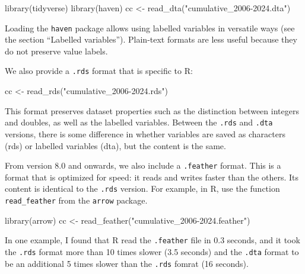 \documentclass[10pt,article,oneside]{memoir}
\newenvironment{Shaded}{\begin{snugshade}}{\end{snugshade}}
\newcommand{\FunctionTok}[1]{\textcolor[rgb]{0.28,0.35,0.67}{#1}}
\newcommand{\NormalTok}[1]{\textcolor[rgb]{0.00,0.23,0.31}{#1}}
\newcommand{\OtherTok}[1]{\textcolor[rgb]{0.00,0.23,0.31}{#1}}
\newcommand{\StringTok}[1]{\textcolor[rgb]{0.13,0.47,0.30}{#1}}
\begin{document}
\begin{Shaded}
\begin{Highlighting}[]
\FunctionTok{library}\NormalTok{(tidyverse)}
\FunctionTok{library}\NormalTok{(haven)}
\NormalTok{cc }\OtherTok{\textless{}{-}} \FunctionTok{read\_dta}\NormalTok{(}\StringTok{"cumulative\_2006{-}2024.dta"}\NormalTok{)}
\end{Highlighting}
\end{Shaded}

Loading the \texttt{haven} package allows using labelled variables in
versatile ways (see the section ``Labelled variables''). Plain-text
formats are less useful because they do not preserve value labels.

We also provide a \texttt{.rds} format that is specific to R:

\begin{Shaded}
\begin{Highlighting}[]
\NormalTok{cc }\OtherTok{\textless{}{-}} \FunctionTok{read\_rds}\NormalTok{(}\StringTok{"cumulative\_2006{-}2024.rds"}\NormalTok{)}
\end{Highlighting}
\end{Shaded}

This format preserves dataset properties such as the distinction between
integers and doubles, as well as the labelled variables. Between the
\texttt{.rds} and \texttt{.dta} versions, there is some difference in
whether variables are saved as characters (rds) or labelled variables
(dta), but the content is the same.

From version 8.0 and onwards, we also include a \texttt{.feather}
format. This is a format that is optimized for speed: it reads and
writes faster than the others. Its content is identical to the
\texttt{.rds} version. For example, in R, use the function
\texttt{read\_feather} from the \texttt{arrow} package.

\begin{Shaded}
\begin{Highlighting}[]
\FunctionTok{library}\NormalTok{(arrow)}
\NormalTok{cc }\OtherTok{\textless{}{-}} \FunctionTok{read\_feather}\NormalTok{(}\StringTok{"cumulative\_2006{-}2024.feather"}\NormalTok{)}
\end{Highlighting}
\end{Shaded}

In one example, I found that R read the \texttt{.feather} file in 0.3
seconds, and it took the \texttt{.rds} format more than 10 times slower
(3.5 seconds) and the \texttt{.dta} format to be an additional 5 times
slower than the \texttt{.rds} fomrat (16 seconds).
\end{document}
